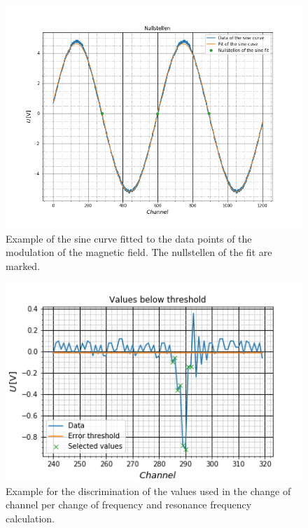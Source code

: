 \begin{figure}[h]
	\includegraphics[scale=0.5]{Bild/nullstellen}
	\centering
	\caption[Plot of the nullstellen]{Example of the sine curve fitted to the data points of the modulation of the magnetic field. The nullstellen of the fit are marked.}
	\label{nullstellen}
\end{figure}

\begin{figure}[h]
	\includegraphics[scale=0.9]{Bild/discr}
	\centering
	\caption[Plot of a discriminated dip]{Example for the discrimination of the values used in the change of channel per change of frequency and resonance frequency calculation.}
	\label{discr_points}
\end{figure}




\FloatBarrier
